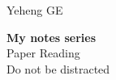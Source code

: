 \begin{titlepage} 
\AddToShipoutPictureBG*{\AtPageLowerLeft{%
  \color{accentcolour!75}\rule{.1\paperwidth}{\paperheight}}}
	\raggedright %

	\vspace*{\baselineskip} 
        
	\vspace{40mm}
        \hspace{15mm}
	{\Large Yeheng GE} 
	
	\vspace*{0.167\textheight} 
        \hspace{15mm}
	\textbf{\LARGE My notes series}\\[\baselineskip] 
	\hspace{15mm}
	{\textcolor{accentcolour}{\Huge Paper Reading}}\\[\baselineskip] 
	\hspace{15mm}
	{\Large Do not be distracted}
	
	\vfill 

	
	\date{\today} 
	
	\vspace*{3\baselineskip} 

\end{titlepage}